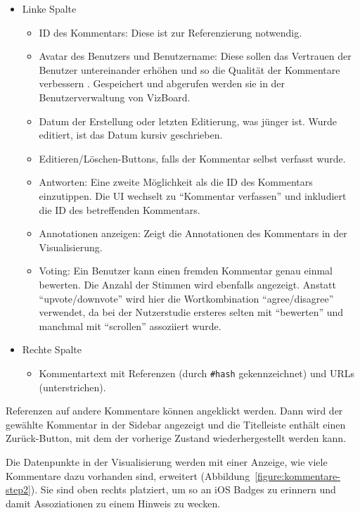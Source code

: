\documentclass[
	headsepline,
	footsepline,
	fontsize=12pt,
	bibliography=totoc
]{scrbook}
\begin{document}
\begin{itemize}
	\item Linke Spalte
	\begin{itemize}
		\item ID des Kommentars: Diese ist zur Referenzierung notwendig.
		\item Avatar des Benutzers und Benutzername: Diese sollen das Vertrauen der Benutzer untereinander erhöhen und so die Qualität der Kommentare verbessern \cite{Chiu2006}. Gespeichert und abgerufen werden sie in der Benutzerverwaltung von VizBoard.
		\item Datum der Erstellung oder letzten Editierung, was jünger ist. Wurde editiert, ist das Datum kursiv geschrieben.
		\item Editieren/Löschen-Buttons, falls der Kommentar selbst verfasst wurde.
		\item Antworten: Eine zweite Möglichkeit als die ID des Kommentars einzutippen. Die UI wechselt zu \enquote{Kommentar verfassen} und inkludiert die ID des betreffenden Kommentars.
		\item Annotationen anzeigen: Zeigt die Annotationen des Kommentars in der Visualisierung.
		\item Voting: Ein Benutzer kann einen fremden Kommentar genau einmal bewerten. Die Anzahl der Stimmen wird ebenfalls angezeigt. Anstatt \enquote{upvote/downvote} wird hier die Wortkombination \enquote{agree/disagree} verwendet, da bei der Nutzerstudie ersteres selten mit \enquote{bewerten} und manchmal mit \enquote{scrollen} assoziiert wurde.
	\end{itemize}
	\item Rechte Spalte
	\begin{itemize}
		\item Kommentartext mit Referenzen (durch \texttt{\#hash} gekennzeichnet) und URLs (unterstrichen).
	\end{itemize}
\end{itemize}

Referenzen auf andere Kommentare können angeklickt werden. Dann wird der gewählte Kommentar in der Sidebar angezeigt und die Titelleiste enthält einen Zurück-Button, mit dem der vorherige Zustand wiederhergestellt werden kann.

Die Datenpunkte in der Visualisierung werden mit einer Anzeige, wie viele Kommentare dazu vorhanden sind, erweitert (Abbildung~\ref{figure:kommentare-step2}). Sie sind oben rechts platziert, um so an iOS Badges zu erinnern und damit Assoziationen zu einem Hinweis zu wecken.
\end{document}
